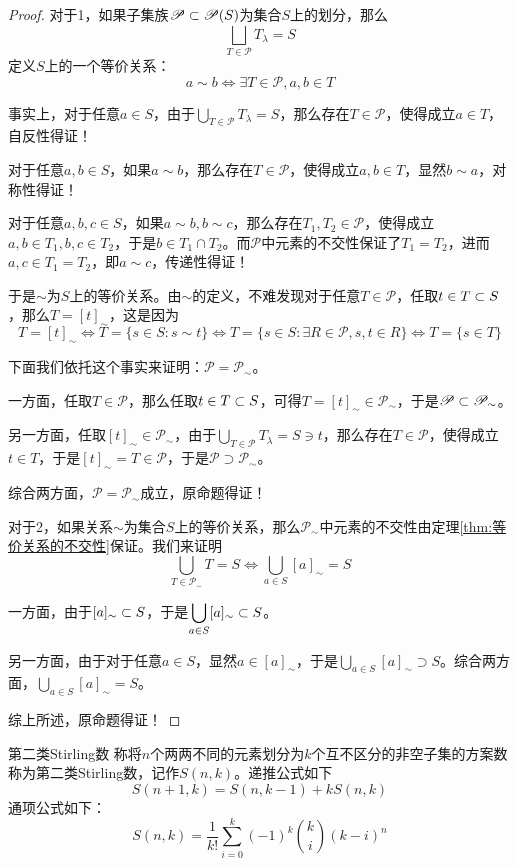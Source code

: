 \begin{proof}
	对于1，如果子集族$\mathscr{P}\subset \mathscr{P}(S)$为集合$S$上的划分，那么
	$$
	\bigsqcup_{ T\in\mathscr{P}}T_\lambda=S
	$$
	定义$S$上的一个等价关系：
	$$
	a\sim b\iff 
	\exists T\in\mathscr{P},a,b\in T
	$$
	
	事实上，对于任意$a\in S$，由于$\displaystyle\bigcup_{ T\in\mathscr{P}}T_\lambda=S$，那么存在$T\in\mathscr{P}$，使得成立$a\in T$，自反性得证！
	
	对于任意$a,b\in S$，如果$a\sim b$，那么存在$T\in\mathscr{P}$，使得成立$a,b\in T$，显然$b\sim a$，对称性得证！
	
	对于任意$a,b,c\in S$，如果$a\sim b,b\sim c$，那么存在$T_1,T_2\in\mathscr{P}$，使得成立$a,b\in T_1,b,c\in T_2$，于是$b\in T_1\cap T_2$。而$\mathscr{P}$中元素的不交性保证了$T_1=T_2$，进而$a,c\in T_1=T_2$，即$a\sim c$，传递性得证！
	
	于是$\sim$为$S$上的等价关系。由$\sim$的定义，不难发现对于任意$T\in\mathscr{P}$，任取$t\in T\subset S$，那么$T=[t]_\sim$，这是因为
	$$
	T=[t]_\sim\iff
	T=\{ s\in S:s\sim t \}\iff
	T=\{ s\in S:\exists R\in\mathscr{P},s,t\in R\}\iff
	T=\{ s\in T \}
	$$
	
	下面我们依托这个事实来证明：$\mathscr{P}=\mathscr{P}_\sim$。
	
	一方面，任取$T\in\mathscr{P}$，那么任取$t\in T\subset S$，可得$T=[t]_\sim \in\mathscr{P}_\sim$，于是$\mathscr{P}\subset\mathscr{P}_\sim$。
	
	另一方面，任取$[t]_\sim\in\mathscr{P}_\sim$，由于$\displaystyle\bigcup_{ T\in\mathscr{P}}T_\lambda=S\ni  t$，那么存在$T\in\mathscr{P}$，使得成立$t\in T$，于是$[t]_\sim =T\in \mathscr{P}$，于是$\mathscr{P}\supset\mathscr{P}_\sim$。
	
	综合两方面，$\mathscr{P}=\mathscr{P}_\sim$成立，原命题得证！
	
	对于2，如果关系$\sim$为集合$S$上的等价关系，那么$\mathscr{P}_\sim$中元素的不交性由定理\ref{thm:等价关系的不交性}保证。我们来证明
	$$
	\bigcup_{T\in\mathscr{P}_\sim}T=S
	\iff\bigcup_{a\in S}[a]_{\sim}=S
	$$
	
	一方面，由于$[a]_\sim\subset S$，于是$\displaystyle\bigcup_{a\in S}[a]_{\sim}\subset S$。
	
	另一方面，由于对于任意$a\in S$，显然$a\in[a]_\sim$，于是$\displaystyle\bigcup_{a\in S}[a]_{\sim}\supset S$。综合两方面，$\displaystyle\bigcup_{a\in S}[a]_{\sim}=S$。
	
	综上所述，原命题得证！
\end{proof}

\begin{definition}{第二类Stirling数}
	称将$n$个两两不同的元素划分为$k$个互不区分的非空子集的方案数称为第二类Stirling数，记作$S(n,k)$。递推公式如下
	$$
	S(n+1,k)=S(n,k-1)+kS(n,k)
	$$
	通项公式如下：
	$$
	S(n,k)=\frac{1}{k!}\sum_{i=0}^{k}(-1)^k{k\choose i}(k-i)^n
	$$
\end{definition}

